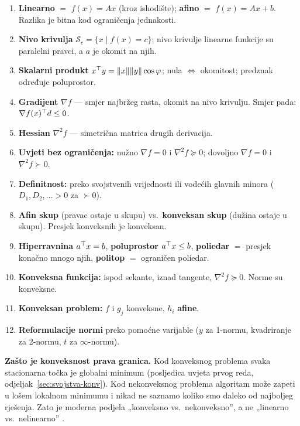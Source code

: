 \begin{enumerate}
  \item \textbf{Linearno} $=$ $f(x) = Ax$ (kroz ishodište); \textbf{afino} $=$
        $f(x) = Ax + b$. Razlika je bitna kod ograničenja jednakosti.
  \item \textbf{Nivo krivulja} $\mathcal{S}_c = \{x \mid f(x) = c\}$; nivo
        krivulje linearne funkcije su paralelni pravci, a $a$ je okomit na njih.
  \item \textbf{Skalarni produkt} $x^{\top} y = \|x\|\|y\|\cos\varphi$; nula
        $\Leftrightarrow$ okomitost; predznak određuje poluprostor.
  \item \textbf{Gradijent} $\nabla f$ --- smjer najbržeg rasta, okomit na nivo
        krivulju. Smjer pada: $\nabla f(x)^{\top} d \le 0$.
  \item \textbf{Hessian} $\nabla^2 f$ --- simetrična matrica drugih derivacija.
  \item \textbf{Uvjeti bez ograničenja:} nužno $\nabla f = 0$ i
        $\nabla^2 f \succeq 0$; dovoljno $\nabla f = 0$ i $\nabla^2 f \succ 0$.
  \item \textbf{Definitnost:} preko svojstvenih vrijednosti ili vodećih glavnih
        minora ($D_1, D_2, \dots > 0$ za $\succ 0$).
  \item \textbf{Afin skup} (pravac ostaje u skupu) vs.\ \textbf{konveksan skup}
        (dužina ostaje u skupu). Presjek konveksnih je konveksan.
  \item \textbf{Hiperravnina} $a^{\top} x = b$, \textbf{poluprostor} $a^{\top} x \le b$,
        \textbf{poliedar} $=$ presjek konačno mnogo njih, \textbf{politop} $=$
        ograničen poliedar.
  \item \textbf{Konveksna funkcija:} ispod sekante, iznad tangente,
        $\nabla^2 f \succeq 0$. Norme su konveksne.
  \item \textbf{Konveksan problem:} $f$ i $g_j$ konveksne, $h_i$ \textbf{afine}.
  \item \textbf{Reformulacije normi} preko pomoćne varijable ($y$ za 1-normu,
        kvadriranje za 2-normu, $t$ za $\infty$-normu).
\end{enumerate}

\textbf{Zašto je konveksnost prava granica.} Kod konveksnog problema svaka
stacionarna točka je globalni minimum (posljedica uvjeta prvog reda,
odjeljak~\ref{sec:svojstva-konv}). Kod nekonveksnog problema algoritam može
zapeti u lošem lokalnom minimumu i nikad ne saznamo koliko smo daleko od
najboljeg rješenja. Zato je moderna podjela „konveksno vs.\ nekonveksno”, a ne
„linearno vs.\ nelinearno” .

